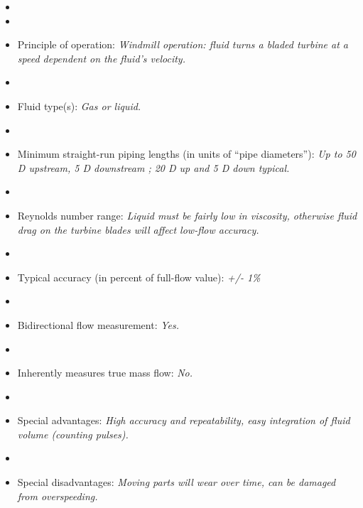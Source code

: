 \documentclass[12pt,a4paper]{article}
\begin{document}
\begin{itemize}
\goodbreak
\item{} 
\vskip 5pt
\item\item{} Principle of operation: {\it Windmill operation: fluid turns a bladed turbine at a speed dependent on the fluid's velocity.}
\vskip 5pt
\item\item{} Fluid type(s): {\it Gas or liquid.}
\vskip 5pt
\item\item{} Minimum straight-run piping lengths (in units of ``pipe diameters''): {\it Up to 50 D upstream, 5 D downstream ; 20 D up and 5 D down typical.}
\vskip 5pt
\item\item{} Reynolds number range: {\it Liquid must be fairly low in viscosity, otherwise fluid drag on the turbine blades will affect low-flow accuracy.}
\vskip 5pt
\item\item{} Typical accuracy (in percent of full-flow value): {\it +/- 1\%}
\vskip 5pt
\item\item{} Bidirectional flow measurement: {\it Yes.}
\vskip 5pt
\item\item{} Inherently measures true mass flow: {\it No.}
\vskip 5pt
\item\item{} Special advantages: {\it High accuracy and repeatability, easy integration of fluid volume (counting pulses).}
\vskip 5pt
\item\item{} Special disadvantages: {\it Moving parts will wear over time, can be damaged from overspeeding.}
\end{itemize}
\end{document}
